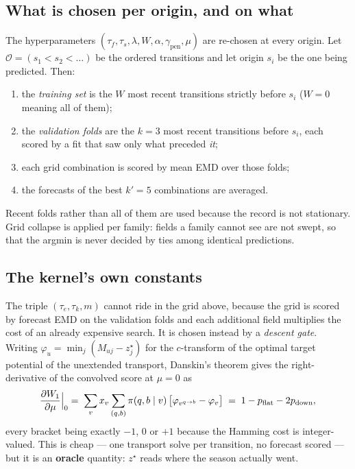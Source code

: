 \documentclass[11pt]{article}
\theoremstyle{remark}
\newcommand{\1}{\mathbf{1}}
\begin{document}
\subsection{What is chosen per origin, and on what}

The hyperparameters $(\tau_f, \tau_s, \lambda, W, \alpha, \gamma_{\mathrm{pen}}, \mu)$
are re-chosen at every origin. Let $\mathcal{O} = (s_1 < s_2 < \dots)$ be the ordered
transitions and let origin $s_i$ be the one being predicted. Then:
\begin{enumerate}[noitemsep]
  \item the \emph{training set} is the $W$ most recent transitions strictly before $s_i$
        ($W = 0$ meaning all of them);
  \item the \emph{validation folds} are the $k = 3$ most recent transitions before $s_i$,
        each scored by a fit that saw only what preceded \emph{it};
  \item each grid combination is scored by mean EMD over those folds;
  \item the forecasts of the best $k' = 5$ combinations are averaged.
\end{enumerate}
Recent folds rather than all of them are used because the record is not stationary. Grid
collapse is applied per family: fields a family cannot see are not swept, so that the
argmin is never decided by ties among identical predictions.

\subsection{The kernel's own constants}\label{sec:gatesel}

The triple $(\tau_e, \tau_k, m)$ cannot ride in the grid above, because the grid is scored
by forecast EMD on the validation folds and each additional field multiplies the cost of
an already expensive search. It is chosen instead by a \emph{descent gate}. Writing
$\varphi_u = \min_j (M_{uj} - z^\star_j)$ for the $c$-transform of the optimal target
potential of the unextended transport, Danskin's theorem gives the right-derivative of the
convolved score at $\mu = 0$ as
\begin{equation}
  \frac{\partial W_1}{\partial \mu}\Bigl|_{0}
  \;=\; \sum_v x_v \sum_{(q,b)} \pi(q,b \mid v)\,
        \bigl[\varphi_{v^{q\to b}} - \varphi_v\bigr]
  \;=\; 1 - p_{\mathrm{flat}} - 2p_{\mathrm{down}},
  \label{eq:deriv}
\end{equation}
every bracket being exactly $-1$, $0$ or $+1$ because the Hamming cost is integer-valued.
This is cheap --- one transport solve per transition, no forecast scored --- but it is an
\textbf{oracle} quantity: $z^\star$ reads where the season actually went.
\end{document}
